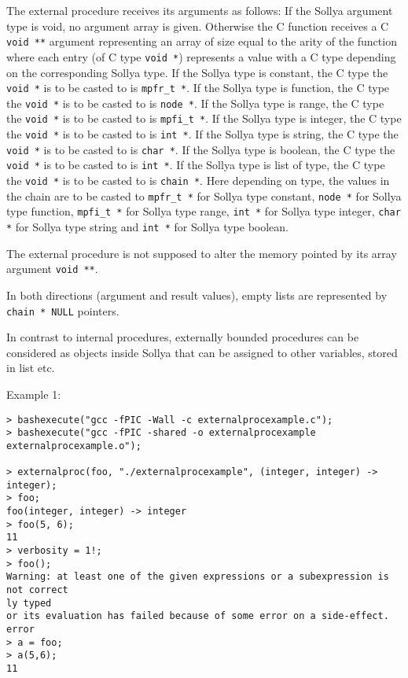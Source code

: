 \begin{itemize}
   The external procedure receives its arguments as follows: If the
   Sollya argument type is void, no argument array is given.  Otherwise
   the C function receives a C \texttt{void **} argument representing an array of
   size equal to the arity of the function where each entry (of C type
   \texttt{void *}) represents a value with a C type depending on the
   corresponding Sollya type. If the Sollya type is constant, the C
   type the \texttt{void *} is to be casted to is \texttt{mpfr\_t *}.  If the Sollya type
   is function, the C type the \texttt{void *} is to be casted to is \texttt{node *}.  If
   the Sollya type is range, the C type the \texttt{void *} is to be casted to is
   \texttt{mpfi\_t *}.  If the Sollya type is integer, the C type the \texttt{void *} is to
   be casted to is \texttt{int *}.  If the Sollya type is string, the C type the
   \texttt{void *} is to be casted to is \texttt{char *}.  If the Sollya type is boolean,
   the C type the \texttt{void *} is to be casted to is \texttt{int *}.  If the Sollya
   type is list of type, the C type the \texttt{void *} is to be casted to is
   \texttt{chain *}.  Here depending on type, the values in the chain are to be
   casted to \texttt{mpfr\_t *}  for Sollya type constant, \texttt{node *} for Sollya type
   function, \texttt{mpfi\_t *} for Sollya type range, \texttt{int *} for Sollya type
   integer, \texttt{char *} for Sollya type string and \texttt{int *} for Sollya type
   boolean.
    
   The external procedure is not supposed to alter the memory pointed by
   its array argument \texttt{void **}.
    
   In both directions (argument and result values), empty lists are
   represented by \texttt{chain * NULL} pointers.
    
   In contrast to internal procedures, externally bounded procedures can
   be considered as objects inside Sollya that can be assigned to other
   variables, stored in list etc.
\end{itemize}
\noindent Example 1: 
\begin{center}\begin{minipage}{15cm}\begin{Verbatim}[frame=single]
> bashexecute("gcc -fPIC -Wall -c externalprocexample.c");
> bashexecute("gcc -fPIC -shared -o externalprocexample externalprocexample.o");

> externalproc(foo, "./externalprocexample", (integer, integer) -> integer);
> foo;
foo(integer, integer) -> integer
> foo(5, 6);
11
> verbosity = 1!;
> foo();
Warning: at least one of the given expressions or a subexpression is not correct
ly typed
or its evaluation has failed because of some error on a side-effect.
error
> a = foo;
> a(5,6);
11
\end{Verbatim}
\end{minipage}\end{center}
